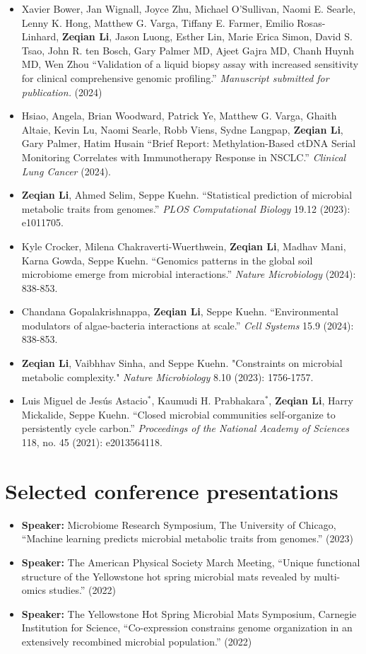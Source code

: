 \documentclass[letterpaper,11pt]{article}
\newcommand{\resumeSubHeadingListStart}{\begin{itemize}[leftmargin=0in]}
\newcommand{\resumeSubHeadingListEnd}{\end{itemize}}
\begin{document}
 \resumeSubHeadingListStart
     \item[] Xavier Bower, Jan Wignall, Joyce Zhu, Michael O’Sullivan, Naomi E. Searle, Lenny K. Hong, Matthew G. Varga, Tiffany E. Farmer, Emilio Rosas-Linhard, \textbf{Zeqian Li}, Jason Luong, Esther Lin, Marie Erica Simon, David S. Tsao, John R. ten Bosch, Gary Palmer MD, Ajeet Gajra MD, Chanh Huynh MD, Wen Zhou ``Validation of a liquid biopsy assay with increased sensitivity for clinical comprehensive genomic profiling.''  \textit{Manuscript submitted for publication.} (2024)
     \item[] Hsiao, Angela, Brian Woodward, Patrick Ye, Matthew G. Varga, Ghaith Altaie, Kevin Lu, Naomi Searle, Robb Viens, Sydne Langpap, \textbf{Zeqian Li}, Gary Palmer, Hatim Husain ``Brief Report: Methylation-Based ctDNA Serial Monitoring Correlates with Immunotherapy Response in NSCLC.'' \textit{Clinical Lung Cancer} (2024).
     \item[] \textbf{Zeqian Li}, Ahmed Selim, Seppe Kuehn. ``Statistical prediction of microbial metabolic traits from genomes.''  \textit{PLOS Computational Biology} 19.12 (2023): e1011705.
     \item[] Kyle Crocker, Milena Chakraverti-Wuerthwein, \textbf{Zeqian Li}, Madhav Mani, Karna Gowda, Seppe Kuehn. ``Genomics patterns in the global soil microbiome emerge from microbial interactions.'' \textit{Nature Microbiology} (2024): 838-853.
     \item[] Chandana Gopalakrishnappa, \textbf{Zeqian Li}, Seppe Kuehn. ``Environmental modulators of algae-bacteria interactions at scale.'' \textit{Cell Systems} 15.9 (2024): 838-853.
     \item[] \textbf{Zeqian Li}, Vaibhhav Sinha, and Seppe Kuehn. "Constraints on microbial metabolic complexity." \textit{Nature Microbiology} 8.10 (2023): 1756-1757.
     \item[] Luis Miguel de Jesús Astacio$^*$, Kaumudi H. Prabhakara$^*$, \textbf{Zeqian Li}, Harry Mickalide, Seppe Kuehn. ``Closed microbial communities self-organize to persistently cycle carbon.''  \textit{Proceedings of the National Academy of Sciences} 118, no. 45 (2021): e2013564118. 
 \resumeSubHeadingListEnd

\section{Selected conference presentations}
\resumeSubHeadingListStart
     \item[] \textbf{Speaker:} Microbiome Research Symposium, The University of Chicago, ``Machine learning predicts microbial metabolic traits from genomes.''  (2023)
     \item[] \textbf{Speaker:} The American Physical Society March Meeting, ``Unique functional structure of the Yellowstone hot spring microbial mats revealed by multi-omics studies.''  (2022)
     \item[] \textbf{Speaker:} The Yellowstone Hot Spring Microbial Mats Symposium, Carnegie Institution for Science, ``Co-expression constrains genome organization in an extensively recombined microbial population.''  (2022)
     

     
 \resumeSubHeadingListEnd



\end{document}
